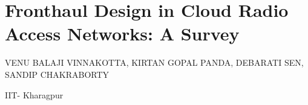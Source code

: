 \chapter{Fronthaul Design in Cloud Radio Access Networks: A Survey}

\begin{center}
{\large\uppercase{Venu Balaji Vinnakotta, Kirtan Gopal Panda, Debarati Sen, Sandip chakraborty}} 

\vskip -6pt

IIT- Kharagpur \\ 
\end{center}





\vfill

\newpage

